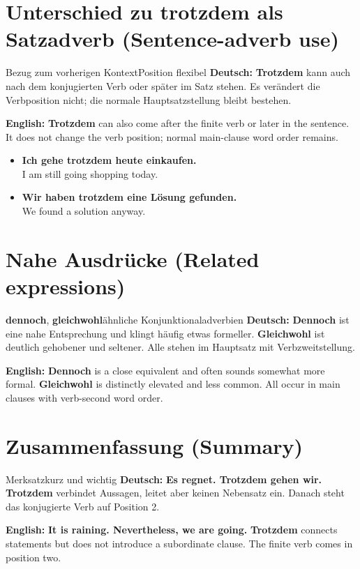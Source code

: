 \documentclass[a4paper,11pt]{article}
\newcommand{\GermanText}[1]{\textbf{Deutsch: }#1\par}\newcommand{\EnglishText}[1]{{\small\color{SoftGray}\textbf{English: }#1\par}}\newcommand{\ExampleItem}[2]{\item \textbf{#1}\\{\small\color{SoftGray}#2}}
\begin{document}
\section{Unterschied zu \glqq trotzdem\grqq{} als Satzadverb \textnormal{(Sentence-adverb use)}}
\begin{grammarentry}{Bezug zum vorherigen Kontext}{Position flexibel}
\GermanText{\textbf{Trotzdem} kann auch nach dem konjugierten Verb oder später im Satz stehen. Es verändert die Verbposition nicht; die normale Hauptsatzstellung bleibt bestehen.}
\EnglishText{\textbf{Trotzdem} can also come after the finite verb or later in the sentence. It does not change the verb position; normal main-clause word order remains.}
\end{grammarentry}
\begin{exbox}\begin{itemize}
\ExampleItem{Ich gehe trotzdem heute einkaufen.}{I am still going shopping today.}
\ExampleItem{Wir haben trotzdem eine Lösung gefunden.}{We found a solution anyway.}
\end{itemize}\end{exbox}

\section{Nahe Ausdrücke \textnormal{(Related expressions)}}
\begin{grammarentry}{\textbf{dennoch}, \textbf{gleichwohl}}{ähnliche Konjunktionaladverbien}
\GermanText{\textbf{Dennoch} ist eine nahe Entsprechung und klingt häufig etwas formeller. \textbf{Gleichwohl} ist deutlich gehobener und seltener. Alle stehen im Hauptsatz mit Verbzweitstellung.}
\EnglishText{\textbf{Dennoch} is a close equivalent and often sounds somewhat more formal. \textbf{Gleichwohl} is distinctly elevated and less common. All occur in main clauses with verb-second word order.}
\end{grammarentry}

\section{Zusammenfassung \textnormal{(Summary)}}
\begin{grammarentry}{Merksatz}{kurz und wichtig}
\GermanText{\textbf{Es regnet. Trotzdem gehen wir.} \quad \textbf{Trotzdem} verbindet Aussagen, leitet aber keinen Nebensatz ein. Danach steht das konjugierte Verb auf Position 2.}
\EnglishText{\textbf{It is raining. Nevertheless, we are going.} \quad \textbf{Trotzdem} connects statements but does not introduce a subordinate clause. The finite verb comes in position two.}
\end{grammarentry}
\end{document}
